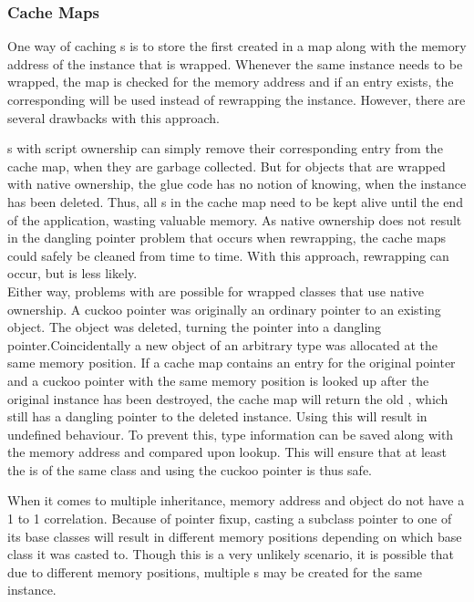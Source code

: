 \subsubsection{Cache Maps}

One way of caching s is to store the first created  in a map along with the memory address of the instance that is wrapped. Whenever the same instance needs to be wrapped, the map is checked for the memory address and if an entry exists, the corresponding  will be used instead of rewrapping the  instance. However, there are several drawbacks with this approach.

s with script ownership can simply remove their corresponding entry from the cache map, when they are garbage collected. But for objects that are wrapped with native ownership, the glue code has no notion of knowing, when the  instance has been deleted. Thus, all s in the cache map need to be kept alive until the end of the application, wasting valuable memory. As native ownership does not result in the  dangling pointer problem that occurs when rewrapping, the cache maps could safely be cleaned from time to time. With this approach, rewrapping can occur, but is less likely.\\
Either way, problems with  are possible for wrapped classes that use native ownership. A cuckoo pointer was originally an ordinary pointer to an existing object. The object was deleted, turning the pointer into a dangling pointer.\linebreak Coincidentally a new object of an arbitrary type was allocated at the same memory position. If a cache map contains an entry for the original pointer and a cuckoo pointer with the same memory position is looked up after the original instance has been destroyed, the cache map will return the old , which still has a dangling pointer to the deleted instance. Using this  will result in undefined behaviour. To prevent this, type information can be saved along with the memory address and compared upon lookup. This will ensure that at least the  is of the same class and using the cuckoo pointer is thus safe.

When it comes to multiple inheritance, memory address and object do not have a 1 to 1 correlation. Because of pointer fixup, casting a subclass pointer to one of its base classes will result in different memory positions depending on which base class it was casted to. Though this is a very unlikely scenario, it is possible that due to different memory positions, multiple s may be created for the same instance.

